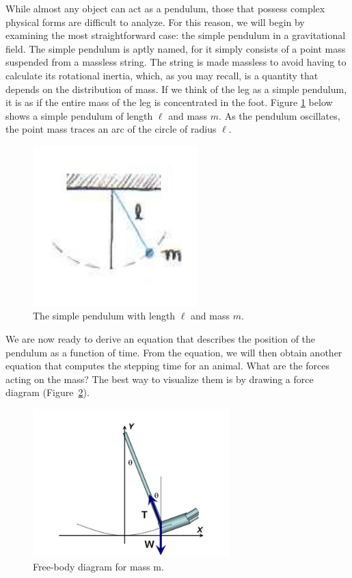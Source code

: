 While almost any object can act as a pendulum, those that possess complex physical forms are difficult to analyze.  For this reason, we will begin by examining the most straightforward case: the simple pendulum in a gravitational field.  The simple pendulum is aptly named, for it simply consists of a point mass suspended from a massless string.  The string is made massless to avoid having to calculate its rotational inertia, which, as you may recall, is a quantity that depends on the distribution of mass.  If we think of the leg as a simple pendulum, it is as if the entire mass of the leg is concentrated in the foot.  Figure \ref{Fig1-1} below shows a simple pendulum of length $\ell$ and mass $m$.  As the pendulum oscillates, the point mass traces an arc of the circle of radius $\ell$.
\begin{figure}[htb]
\centering
	\includegraphics[width=2.5in]{./figures/Topic1/Figure1-1.jpg}
	\caption{The simple pendulum with length $\ell$ and mass $m$.}
	\label{Fig1-1}
\end{figure}

 
We are now ready to derive an equation that describes the position of the pendulum as a function of time.  From the equation, we will then obtain another equation that computes the stepping time for an animal.  
What are the forces acting on the mass?  The best way to visualize them is by drawing a force diagram (Figure~\ref{Fig1-2}).  
\begin{figure}[htb]
	\centering
	\includegraphics[width=3.0in]{./figures/Topic1/Figure1-2.jpg}
	\caption{Free-body diagram for mass m.}
	\label{Fig1-2}
\end{figure}

